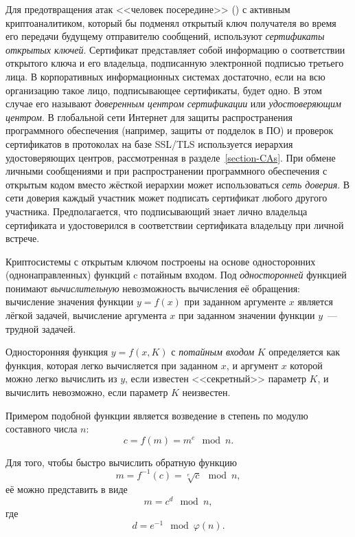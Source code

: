 Для предотвращения атак <<человек посередине>> () с активным криптоаналитиком, который бы подменял открытый ключ получателя во время его передачи будущему отправителю сообщений, используют \emph{сертификаты открытых ключей}. Сертификат представляет собой информацию о соответствии открытого ключа и его владельца, подписанную электронной подписью третьего лица. В корпоративных информационных системах достаточно, если на всю организацию такое лицо, подписывающее сертификаты, будет одно. В этом случае его называют \emph{доверенным центром сертификации} или \emph{удостоверяющим центром}. В глобальной сети Интернет для защиты распространения программного обеспечения (например, защиты от подделок в ПО) и проверок сертификатов в протоколах на базе SSL/TLS используется иерархия удостоверяющих центров, рассмотренная в разделе~\ref{section-CAs}. При обмене личными сообщениями и при распространении программного обеспечения с открытым кодом вместо жёсткой иерархии может использоваться \emph{сеть доверия}. В сети доверия каждый участник может подписать сертификат любого другого участника. Предполагается, что подписывающий знает лично владельца сертификата и удостоверился в соответствии сертификата владельцу при личной встрече.

Криптосистемы с открытым ключом построены на основе односторонних (однонаправленных) функций c потайным входом. Под \emph{односторонней} функцией понимают \emph{вычислительную} невозможность вычисления её обращения: вычисление значения функции $y = f(x)$ при заданном аргументе $x$ является лёгкой задачей, вычисление аргумента $x$ при заданном значении функции $y$~--- трудной задачей.

Односторонняя функция $y = f(x,K)$ с \emph{потайным входом} $K$ определяется как функция, которая легко вычисляется при заданном $x$, и аргумент $x$ которой можно легко вычислить из $y$, если известен <<секретный>> параметр $K$, и вычислить невозможно, если параметр $K$ неизвестен.

Примером подобной функции является возведение в степень по модулю составного числа $n$:
	\[ c = f \left( m \right) = m ^ e \mod n.\]

Для того, чтобы быстро вычислить обратную функцию
	\[ m = f^{-1} \left( c \right) = \sqrt[e]{c} \mod n, \]
её можно представить в виде
	\[ m = c^{d} \mod n,\]
где
	\[ d = e^{-1} \mod \varphi \left( n \right). \]

